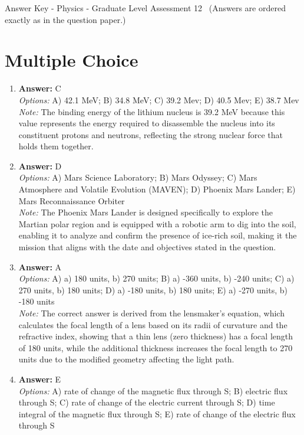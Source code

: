 \documentclass[12pt]{article}
\begin{document}
\begin{center}
Answer Key - Physics - Graduate Level Assessment 12 \
\small (Answers are ordered exactly as in the question paper.)
\end{center}

\section*{Multiple Choice}
\begin{enumerate}[label=\arabic*.]
\item \textbf{Answer:} C
\\ \textit{Options:} A) 42.1 MeV; B) 34.8 MeV; C) 39.2 Mev; D) 40.5 Mev; E) 38.7 Mev
\\ \textit{Note:} The binding energy of the lithium nucleus is 39.2 MeV because this value represents the energy required to disassemble the nucleus into its constituent protons and neutrons, reflecting the strong nuclear force that holds them together.
\item \textbf{Answer:} D
\\ \textit{Options:} A) Mars Science Laboratory; B) Mars Odyssey; C) Mars Atmosphere and Volatile Evolution (MAVEN); D) Phoenix Mars Lander; E) Mars Reconnaissance Orbiter
\\ \textit{Note:} The Phoenix Mars Lander is designed specifically to explore the Martian polar region and is equipped with a robotic arm to dig into the soil, enabling it to analyze and confirm the presence of ice-rich soil, making it the mission that aligns with the date and objectives stated in the question.
\item \textbf{Answer:} A
\\ \textit{Options:} A) a) 180 units, b) 270 units; B) a) -360 units, b) -240 units; C) a) 270 units, b) 180 units; D) a) -180 units, b) 180 units; E) a) -270 units, b) -180 units
\\ \textit{Note:} The correct answer is derived from the lensmaker's equation, which calculates the focal length of a lens based on its radii of curvature and the refractive index, showing that a thin lens (zero thickness) has a focal length of 180 units, while the additional thickness increases the focal length to 270 units due to the modified geometry affecting the light path.
\item \textbf{Answer:} E
\\ \textit{Options:} A) rate of change of the magnetic flux through S; B) electric flux through S; C) rate of change of the electric current through S; D) time integral of the magnetic flux through S; E) rate of change of the electric flux through S

\end{enumerate}
\end{document}
